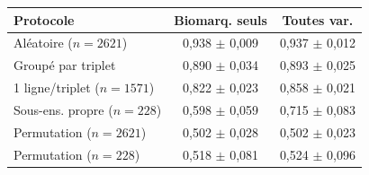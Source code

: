 \begin{tabular}{lcc}
\toprule
Protocole & Biomarq. seuls & Toutes var. \\
\midrule
Aléatoire ($n=2621$) & 0,938 $\pm$ 0,009 & 0,937 $\pm$ 0,012 \\
Groupé par triplet & 0,890 $\pm$ 0,034 & 0,893 $\pm$ 0,025 \\
1 ligne/triplet ($n=1571$) & 0,822 $\pm$ 0,023 & 0,858 $\pm$ 0,021 \\
Sous-ens. propre ($n=228$) & 0,598 $\pm$ 0,059 & 0,715 $\pm$ 0,083 \\
\midrule
Permutation ($n=2621$) & 0,502 $\pm$ 0,028 & 0,502 $\pm$ 0,023 \\
Permutation ($n=228$) & 0,518 $\pm$ 0,081 & 0,524 $\pm$ 0,096 \\
\bottomrule
\end{tabular}